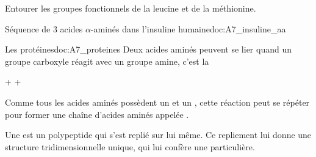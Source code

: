 
\numeroQuestion Entourer les groupes fonctionnels de la leucine et de la méthionine.


\begin{doc}{Séquence de 3 acides $\alpha$-aminés dans l'insuline humaine}{doc:A7_insuline_aa}
  \begin{center}
  \end{center}
\end{doc}

\begin{doc}{Les protéines}{doc:A7_proteines}
  Deux acides aminés peuvent se lier quand un groupe carboxyle réagit avec un groupe amine, c'est la 
  
  \begin{center}
     +   
    \reaction
     +
  \end{center}
  \vspace*{-4pt}

  Comme tous les acides aminés possèdent un  et un , cette réaction peut se répéter pour former une chaîne d'acides aminés appelée .

  \begin{importants}
    Une  est un polypeptide qui s'est replié sur lui même.
    Ce repliement lui donne une structure tridimensionnelle unique, qui lui confère une  particulière.
  \end{importants}
  \begin{center}
  \end{center}
\end{doc}



